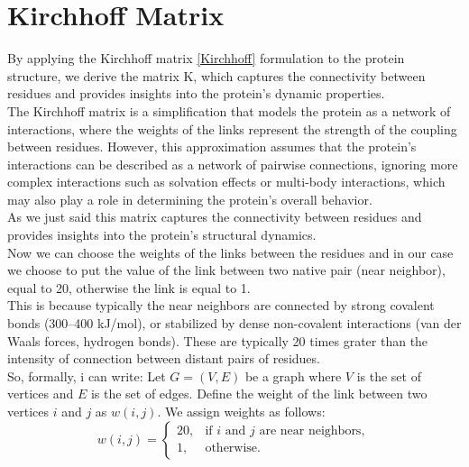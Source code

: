 \documentclass[English, Lau, oneside]{sapthesis}
\begin{document}
\section{Kirchhoff Matrix}\label{Kirchhoff_paragraph}
\noindent 
By applying the Kirchhoff matrix \eqref{Kirchhoff} formulation to the protein structure, we derive the matrix K, which captures the connectivity between residues and provides insights into the protein’s dynamic properties.\\
The Kirchhoff matrix is a simplification that models the protein as a network of interactions, where the weights of the links represent the strength of the coupling between residues. However, this approximation assumes that the protein’s interactions can be described as a network of pairwise connections, ignoring more complex interactions such as solvation effects or multi-body interactions, which may also play a role in determining the protein’s overall behavior.\\
As we just said this matrix captures the connectivity between residues and provides insights into the protein's structural dynamics. \\
Now we can choose the weights of the links between the residues and in our case we choose to put the value of the link between two native pair (near neighbor), equal to 20, otherwise the link is equal to 1.\\
This is because typically the near neighbors are connected by strong covalent bonds (300–400 kJ/mol), or stabilized by dense non-covalent interactions (van der Waals forces, hydrogen bonds). 
These are typically 20 times grater than the intensity of connection between distant pairs of residues.\\
So, formally, i can write:
Let \( G = (V, E) \) be a graph where \( V \) is the set of vertices and \( E \) is the set of edges. Define the weight of the link between two vertices \( i \) and \( j \) as \( w(i, j) \).
We assign weights as follows:
\[
w(i, j) =
\begin{cases}
20, & \text{if } i \text{ and } j \text{ are near neighbors}, \\
1, & \text{otherwise}.
\end{cases}
\]
\end{document}
